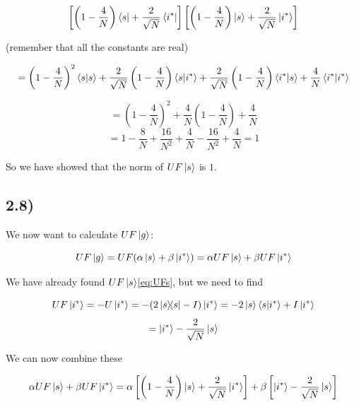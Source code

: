 \documentclass[a4paper,norsk, 10pt]{article}
\begin{document}
\begin{equation}
\left[\left(1 - \frac{4}{N}\right)\bra{s} + \frac{2}{\sqrt{N}}\bra{i^*}\right]\left[\left(1 - \frac{4}{N}\right)\ket{s} + \frac{2}{\sqrt{N}}\ket{i^*}\right]
\end{equation}

(remember that all the constants are real)

\begin{equation}
= \left(1 - \frac{4}{N}\right)^2\braket{s}{s} +\frac{2}{\sqrt{N}} \left(1 - \frac{4}{N}\right)\bra{s}\ket{i^*} + \frac{2}{\sqrt{N}} \left(1 - \frac{4}{N}\right)\bra{i^*}\ket{s} + \frac{4}{N}\braket{i^*}{i^*}
\end{equation}

\begin{equation}
= \left(1 - \frac{4}{N}\right)^2 + \frac{4}{N}\left(1 - \frac{4}{N}\right) + \frac{4}{N}
\end{equation}
\begin{equation}
= 1 - \frac{8}{N} + \frac{16}{N^2} + \frac{4}{N} - \frac{16}{N^2} + \frac{4}{N} = 1
\end{equation}


So we have showed that the norm of $UF\ket{s}$ is $1$.


\subsection{2.8)}

We now want to calculate $UF\ket{g}$:

\begin{equation}
UF\ket{g} = UF(\alpha\ket{s} + \beta\ket{i^*}) = \alpha UF\ket{s} + \beta UF\ket{i^*}
\end{equation}

We have already found $UF\ket{s}$\eqref{eq:UFs}, but we need to find

\begin{equation}
UF\ket{i^*} = -U\ket{i^*} = -(2\ketbra{s}{s} - I)\ket{i^*} = -2\ket{s}\braket{s}{i^*} + I\ket{i^*}
\end{equation}
\begin{equation}
= \ket{i^*} - \frac{2}{\sqrt{N}}\ket{s}
\end{equation}


We can now combine these

\begin{equation}
\alpha UF\ket{s} + \beta UF\ket{i^*} = \alpha\left[\left(1 - \frac{4}{N}\right)\ket{s} + \frac{2}{\sqrt{N}}\ket{i^*} \right] + \beta\left[\ket{i^*} - \frac{2}{\sqrt{N}}\ket{s}\right]
\end{equation}
\end{document}
